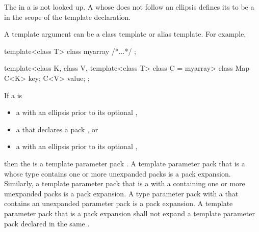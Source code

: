 \documentclass{wg21}
\begin{document}
\begin{addedblock}
The  in a  is not looked up.
A  whose  does not follow an ellipsis defines its
 to be a  in the scope of the template declaration.
\end{addedblock}

\begin{note}
A template argument can be a class template or alias template.
For example,

\begin{codeblock}
    template<class T> class myarray { /*...*/ };

    template<class K, class V, template<class T> class C = myarray>
    class Map {
        C<K> key;
        C<V> value;
    };
\end{codeblock}
\end{note}


\pnum
If a  is 
\begin{addedblock}
\begin{itemize}
\item a  with an ellipsis prior to its optional ,
\item a  that declares a pack , or
\item a  with an ellipsis prior to its optional ,
\end{itemize}
\end{addedblock}
then the 
is a template parameter pack .
A template parameter pack that is a  whose type
contains one or more unexpanded packs is a pack expansion. Similarly,
a template parameter pack that is a  with a
 containing one or more unexpanded
packs is a pack expansion.
A type parameter pack with a  that
contains an unexpanded parameter pack is a pack expansion.
A template parameter pack that is a pack
expansion shall not expand a template parameter pack declared in the same
.
\end{document}
